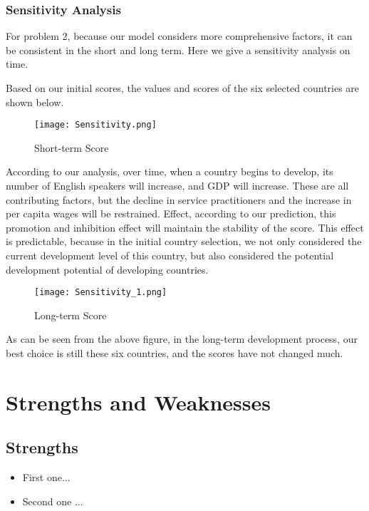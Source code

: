 \documentclass[12pt]{article}  %
\begin{document}
\subsubsection{Sensitivity Analysis}

For problem 2, because our model considers more comprehensive factors, it can be consistent in the short and long term. Here we give a sensitivity analysis on time.

Based on our initial scores, the values and scores of the six selected countries are shown below.

\begin{figure}[H]
	\centering
	\texttt{[image: Sensitivity.png]}
	\caption{Short-term Score}\label{fig:sensitivity}
\end{figure}

According to our analysis, over time, when a country begins to develop, its number of English speakers will increase, and GDP will increase. These are all contributing factors, but the decline in service practitioners and the increase in per capita wages will be restrained. Effect, according to our prediction, this promotion and inhibition effect will maintain the stability of the score. This effect is predictable, because in the initial country selection, we not only considered the current development level of this country, but also considered the potential development potential of developing countries.

\begin{figure}[H]
	\centering
	\texttt{[image: Sensitivity\_1.png]}
	\caption{Long-term Score}\label{fig:sensitivity_1}
\end{figure}

As can be seen from the above figure, in the long-term development process, our best choice is still these six countries, and the scores have not changed much.













\section{Strengths and Weaknesses}
\subsection{Strengths}
\begin{itemize}
    \item First one...
    \item Second one ...
\end{itemize}
\end{document}
